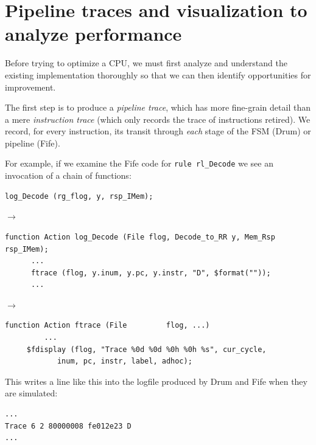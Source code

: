 
\section{Pipeline traces and visualization to analyze performance}

Before trying to optimize a CPU, we must first analyze and understand
the existing implementation thoroughly so that we can then identify
opportunities for improvement.


The first step is to produce a \emph{pipeline trace}, which has more
fine-grain detail than a mere \emph{instruction trace} (which only
records the trace of instructions retired).  We record, for every
instruction, its transit through \emph{each} stage of the FSM (Drum)
or pipeline (Fife).

For example, if we examine the Fife code for \verb|rule rl_Decode| we
see an invocation of a chain of functions:

{\footnotesize
\begin{Verbatim}[frame=single, label=src\_Fife/S2\_Decode.bsv]
      log_Decode (rg_flog, y, rsp_IMem);
\end{Verbatim}
}

$\longrightarrow$

{\footnotesize
\begin{Verbatim}[frame=single, label=src\_Common/Fn\_Decode.bsv]
   function Action log_Decode (File flog, Decode_to_RR y, Mem_Rsp rsp_IMem);
      ...
      ftrace (flog, y.inum, y.pc, y.instr, "D", $format(""));
      ...
\end{Verbatim}
}

$\longrightarrow$

{\footnotesize
\begin{Verbatim}[frame=single, label=src\_Common/Utils.bsv]
function Action ftrace (File         flog, ...)
         ...
	 $fdisplay (flog, "Trace %0d %0d %0h %0h %s", cur_cycle,
		    inum, pc, instr, label, adhoc);
\end{Verbatim}
}

This writes a line like this into the logfile produced by Drum and
Fife when they are simulated:

{\footnotesize
\begin{Verbatim}[frame=single, label=log.txt]
...
Trace 6 2 80000008 fe012e23 D
...
\end{Verbatim}
}


